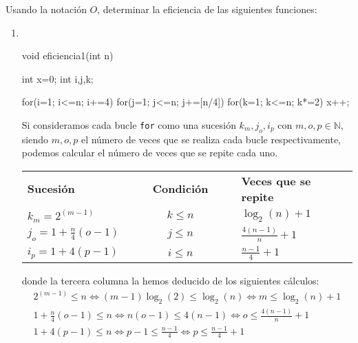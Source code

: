 \begin{ejercicio}
    Usando la notación $O$, determinar la eficiencia de las siguientes funciones:
    \begin{enumerate}[label=\alph*)]
        \item \
        \begin{listing}[H]
            \begin{cppcode}
void eficiencia1(int n){
    int x=0; int i,j,k;
    
    for(i=1; i<=n; i+=4)
        for(j=1; j<=n; j+=[n/4])
            for(k=1; k<=n; k*=2)
                x++;
}
        \end{cppcode}
        \end{listing}

        Si consideramos cada bucle \verb|for| como una sucesión $k_m , j_o , i_p$ con $m, o, p\in \mathbb{N}$, siendo $m, o, p$ el número de veces que se realiza cada bucle respectivamente, podemos calcular el número de veces que se repite cada uno.
    
        \begin{center}
            \begin{tabular}{l l l c l l l}
                \textbf{Sucesión}           &&&  \textbf{Condición} &&& \textbf{Veces que se repite}\\
                $k_m = 2^{(m-1)}$            &&& $k\leq n$           &&& $\log_2(n)+1$\\
                $j_o = 1 + \frac{n}{4}(o-1)$ &&& $j\leq n$           &&& $\frac{4(n-1)}{n} + 1$\\
                $i_p = 1+4 (p-1)$            &&& $i\leq n$           &&& $\frac{n-1}{4} +1$\\
            \end{tabular}
        \end{center}

        donde la tercera columna la hemos deducido de los siguientes cálculos:
        \begin{gather*}
            2^{(m-1)} \leq n \Leftrightarrow (m-1) \log_2(2) \leq \log_2(n) \Leftrightarrow m \leq \log_2(n) +1 \\
            1+ \frac{n}{4}(o-1) \leq n \Leftrightarrow n(o-1)\leq 4(n-1) \Leftrightarrow o\leq \frac{4(n-1)}{n}+1\\
            1+4(p-1) \leq n \Leftrightarrow p - 1 \leq \frac{n-1}{4} \Leftrightarrow p \leq \frac{n-1}{4} + 1
        \end{gather*}


\end{enumerate}
\end{ejercicio}
